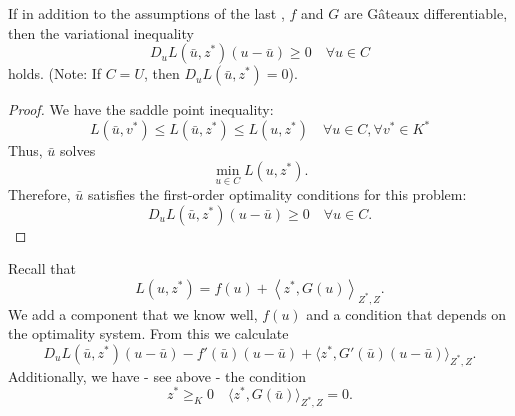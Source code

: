 \documentclass[../skript.tex]{subfiles}
\begin{document}
\begin{theorem}
If in addition to the assumptions of the last , $f$ and $G$ are Gâteaux differentiable, then the variational inequality
\[
	D_u L \left( \bar{u}, z^* \right) \left( u - \bar{u} \right) \geq 0 \quad \forall u \in C
\]
holds.
(Note: If $C = U$, then $D_u L(\bar{u}, z^*) = 0$).
\end{theorem}
\begin{proof}
We have the saddle point inequality:
\[
	L(\bar{u}, v^*) \leq L(\bar{u}, z^*) \leq L(u, z^*) \quad \forall u \in C, \forall v^* \in K^*
\]
Thus, $\bar{u}$ solves
\[
	\min_{u \in C} L(u, z^*).
\]
Therefore, $\bar{u}$ satisfies the first-order optimality conditions for this problem:
\[
	D_u L(\bar{u}, z^*) (u - \bar{u}) \geq 0 \quad \forall u \in C.
\]
\end{proof}
Recall that
\[
L(u, z^*) = f(u) + \left\langle z^*, G(u) \right\rangle_{Z^*, Z}.
\]
We add a component that we know well, $f(u)$ and a condition that depends on the optimality system. From this we calculate
\[
	D_u L(\bar{u}, z^*) ( u - \bar{u}) - f'(\bar{u})(u - \bar{u}) + \langle z^*, G'(\bar{u})(u - \bar{u}) \rangle_{Z^*, Z}.
\]
Additionally, we have - see above - the condition
\[
	z^* \geq_K 0 \quad \langle z^*, G(\bar{u}) \rangle_{Z^*, Z} = 0.
\]
\end{document}
